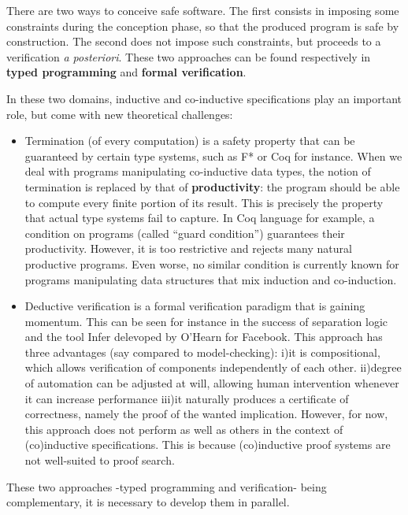 \documentclass{article}
\begin{document}
\smallskip
There are two ways to conceive safe software. The first consists in imposing some constraints
during the conception phase, so that the produced program is safe by construction. The second does not impose such constraints, but proceeds to a verification \textit{a posteriori}. These
two approaches can be found respectively in \textbf{typed programming} and \textbf{formal verification}.



\smallskip
In these two domains, inductive and co-inductive specifications play an important role, but come with new theoretical challenges:
\begin{itemize}
\item Termination (of every computation) is a safety property that can be guaranteed by
certain type systems, such as F* or Coq for instance. 
When we deal with programs manipulating co-inductive data types, the notion of termination
is replaced by that of \textbf{productivity}: the program should be able to compute every finite portion of its result. This is precisely the property that actual type systems fail 
to capture. In Coq language for example, a condition on programs (called ``guard condition'')
 guarantees their productivity. However, it is too restrictive and rejects many natural
productive programs. Even worse, no similar condition is currently known for programs manipulating data structures that mix induction and co-induction. 

\item Deductive verification is a formal verification paradigm that is gaining momentum. This can be seen for instance in the success of separation logic and the tool Infer delevoped by O'Hearn for Facebook. This approach has three advantages (say compared to model-checking):
i)it is compositional, which allows verification of components independently of each other.
ii)degree of automation can be adjusted at will, allowing human intervention whenever it can increase performance
iii)it naturally produces a certificate of correctness, namely the proof of the wanted implication. However, for now, this approach does not perform as well as others in the context of (co)inductive specifications. This is because (co)inductive proof systems are not well-suited to proof search.


\end{itemize}

These two approaches -typed programming and verification- being complementary, it is necessary to develop them in parallel.
\end{document}
